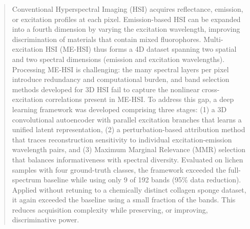 \begin{abstract}
Conventional Hyperspectral Imaging (HSI) acquires reflectance, emission, or excitation profiles at each pixel.
Emission-based HSI can be expanded into a fourth dimension by varying the excitation wavelength, improving discrimination of materials that contain mixed fluorophores.
Multi-excitation HSI (ME-HSI) thus forms a 4D dataset spanning two spatial and two spectral dimensions (emission and excitation wavelengths).
Processing ME-HSI is challenging: the many spectral layers per pixel introduce redundancy and computational burden, and band selection methods developed for 3D HSI fail to capture the nonlinear cross-excitation correlations present in ME-HSI.
To address this gap, a deep learning framework was developed comprising three stages: (1) a 3D convolutional autoencoder with parallel excitation branches that learns a unified latent representation, (2) a perturbation-based attribution method that traces reconstruction sensitivity to individual excitation-emission wavelength pairs, and (3) Maximum Marginal Relevance (MMR) selection that balances informativeness with spectral diversity.
Evaluated on lichen samples with four ground-truth classes, the framework exceeded the full-spectrum baseline while using only 9 of 192 bands (95\% data reduction).
Applied without retuning to a chemically distinct collagen sponge dataset, it again exceeded the baseline using a small fraction of the bands.
This reduces acquisition complexity while preserving, or improving, discriminative power.
\end{abstract}